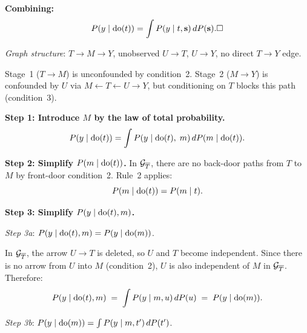 \documentclass[master.tex]{subfiles}
\begin{document}
\begin{tcolorbox}[defstyle, title={Proof of Theorem~\ref{w3:thm:backdoor} (Back-Door Formula) via Rule~3 and the Back-Door d-Separation Argument}]
\noindent\textbf{Combining:}
\[
  P(y \mid \doop(t))
  = \int P(y \mid t, \mathbf{s})\,dP(\mathbf{s}).
  \hfill\square
\]
\end{tcolorbox}

\begin{tcolorbox}[defstyle, title={Proof of Theorem~\ref{w3:thm:frontdoor} (Front-Door Formula) via Three Applications of the Rules}]

\noindent\textit{Graph structure}: $T \to M \to Y$, unobserved $U \to T$,
$U \to Y$, no direct $T \to Y$ edge.

\begin{center}
\end{center}

\noindent Stage~1 ($T \to M$) is unconfounded by condition~2.
Stage~2 ($M \to Y$) is confounded by $U$ via $M \leftarrow T \leftarrow U
\to Y$, but conditioning on $T$ blocks this path (condition~3).

\medskip
\noindent\textbf{Step 1: Introduce $M$ by the law of total probability.}
\[
  P(y \mid \mathrm{do}(t)) = \int P(y \mid \mathrm{do}(t),\;m)\,dP(m \mid \mathrm{do}(t)).
\]

\noindent\textbf{Step 2: Simplify $P(m \mid \mathrm{do}(t))$.}
In $\mathcal{G}_{\overline{T}}$, there are no back-door paths from $T$ to $M$
by front-door condition~2.  Rule~2 applies:
\[
  P(m \mid \mathrm{do}(t)) = P(m \mid t).
\]

\noindent\textbf{Step 3: Simplify $P(y \mid \mathrm{do}(t), m)$.}

\medskip
\noindent\textit{Step 3a}: $P(y \mid \mathrm{do}(t), m) = P(y \mid \mathrm{do}(m))$.

In $\mathcal{G}_{\overline{T}}$, the arrow $U \to T$ is deleted, so $U$ and $T$
become independent.  Since there is no arrow from $U$ into $M$ (condition~2),
$U$ is also independent of $M$ in $\mathcal{G}_{\overline{T}}$.  Therefore:
\[
  P(y \mid \mathrm{do}(t), m) \;=\; \int P(y \mid m, u)\,dP(u) \;=\; P(y \mid \mathrm{do}(m)).
\]

\medskip
\noindent\textit{Step 3b}: $P(y \mid \mathrm{do}(m)) = \int P(y \mid m, t')\,dP(t')$.


\end{tcolorbox}
\end{document}
